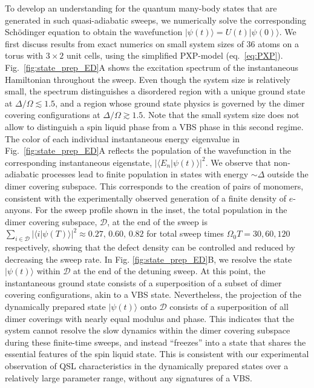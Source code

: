 \documentclass[twocolumn,amssymb,secnumarabic, prl, aps, nofootinbib]{revtex4-1}
\begin{document}
To develop an understanding for the quantum many-body states that are generated in such quasi-adiabatic sweeps, we numerically solve the corresponding Sch\"odinger equation to obtain the wavefunction $|\psi(t)\rangle = U(t)|{\psi(0)}\rangle$. We first discuss results from exact numerics on small system sizes of 36 atoms on a torus with $3\times 2$ unit cells, using the simplified PXP-model (eq.~\eqref{eq:PXP}). Fig.~\ref{fig:state_prep_ED}A shows the excitation spectrum of the instantaneous Hamiltonian throughout the sweep. Even though the system size is relatively small, the spectrum distinguishes a disordered region with a unique ground state at $\Delta/\Omega\lesssim 1.5$, and a region whose ground state physics is governed by the dimer covering configurations at $\Delta/\Omega\gtrsim 1.5$. Note that the small system size does not allow to distinguish a spin liquid phase from a VBS phase in this second regime. The color of each individual instantaneous energy eigenvalue in Fig.~\ref{fig:state_prep_ED}A reflects the population of the wavefunction in the corresponding instantaneous eigenstate, $|\langle E_n|\psi(t)\rangle|^2$. We observe that non-adiabatic processes lead to finite population in states with energy $\sim \Delta$ outside the dimer covering subspace. This corresponds to the creation of pairs of monomers, consistent with the experimentally observed generation of a finite density of $e$-anyons. For the sweep profile shown in the inset, the total population in the dimer covering subspace, $\mathcal{D}$, at the end of the sweep is $\sum_{i\in \mathcal{D}}|\langle i|\psi(T)\rangle|^2\approx0.27,\,0.60,\, 0.82$ for total sweep times $\Omega_0 T=30,60,120$ respectively, showing that the defect density can be controlled and reduced by decreasing the sweep rate. 
In Fig. \ref{fig:state_prep_ED}B, we resolve the state $|\psi(t)\rangle$ within $\mathcal{D}$ at the end of the detuning sweep. At this point, the instantaneous ground state consists of a superposition of a subset of dimer covering configurations, akin to a VBS state. Nevertheless, the projection of the dynamically prepared state $|\psi (t) \rangle$ onto $\mathcal{D}$ consists of a superposition of all dimer coverings with nearly equal modulus and phase. This indicates that the system cannot resolve the slow dynamics within the dimer covering subspace during these finite-time sweeps, and instead ``freezes'' into a state that shares the essential features of the spin liquid state. This is consistent with our experimental observation of QSL characteristics in the dynamically prepared states over a relatively large parameter range, without any signatures of a VBS.
\end{document}
